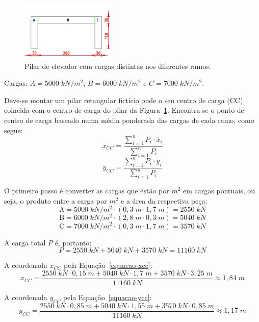 \begin{figure}[H]
	\begin{center}
	\caption{Pilar de elevador com cargas distintas nos diferentes ramos.}
	\label{figura-pilar-de-elevador-cargas-distintas}
    	\includegraphics[width=0.4\textwidth]{Fundacoes-rasas-ou-diretas/Imagens/Pilares-com-cargas-distintas-nos-diferentes-ramos.png}
	\end{center}
\end{figure}

Cargas: $A=5000\;kN/m^2$, $B=6000\;kN/m^2$ e $C=7000\;kN/m^2$.

Deve-se montar um pilar retangular fictício onde o seu centro de carga (CC) coincida com o centro de carga do pilar da Figura~\ref{figura-pilar-de-elevador-cargas-distintas}. Encontra-se o ponto de centro de carga baseado numa média ponderada das cargas de cada ramo, como segue:
\begin{equation}
	\label{equacao-xcc}
	x_{CC}=\frac{\displaystyle\sum_{i=1}^n P_i\cdot \overline{x}_i}{\displaystyle\sum_{i=1}^n P_i}
\end{equation}
\begin{equation}
	\label{equacao-ycc}
	y_{CC}=\frac{\displaystyle\sum_{i=1}^n P_i\cdot \overline{y}_i}{\displaystyle\sum_{i=1}^n P_i}
\end{equation}

O primeiro passo é converter as cargas que estão por $m^2$ em cargas pontuais, ou seja, o produto entre a carga por $m^2$ e a área da respectiva peça:
$$\text{A}=5000\;kN/m^2\cdot(0,3\;m\cdot1,7\;m)=2550\;kN$$
$$\text{B}=6000\;kN/m^2\cdot(2,8\;m\cdot0,3\;m)=5040\;kN$$
$$\text{C}=7000\;kN/m^2\cdot(0,3\;m\cdot1,7\;m)=3570\;kN$$

A carga total $P$ é, portanto:
$$P=2550\;kN+5040\;kN+3570\;kN=11160\;kN$$

A coordenada $x_{CC}$ pela Equação~\eqref{equacao-xcc}:
$$x_{CC}=\frac{2550\;kN\cdot0,15\;m+5040\;kN\cdot1,7\;m+3570\;kN\cdot3,25\;m}{11160\;kN}\approx1,84\;m$$

A coordenada $y_{CC}$ pela Equação~\eqref{equacao-ycc}:
$$y_{CC}=\frac{2550\;kN\cdot0,85\;m+5040\;kN\cdot1,55\;m+3570\;kN\cdot0,85\;m}{11160\;kN}\approx1,17\;m$$

